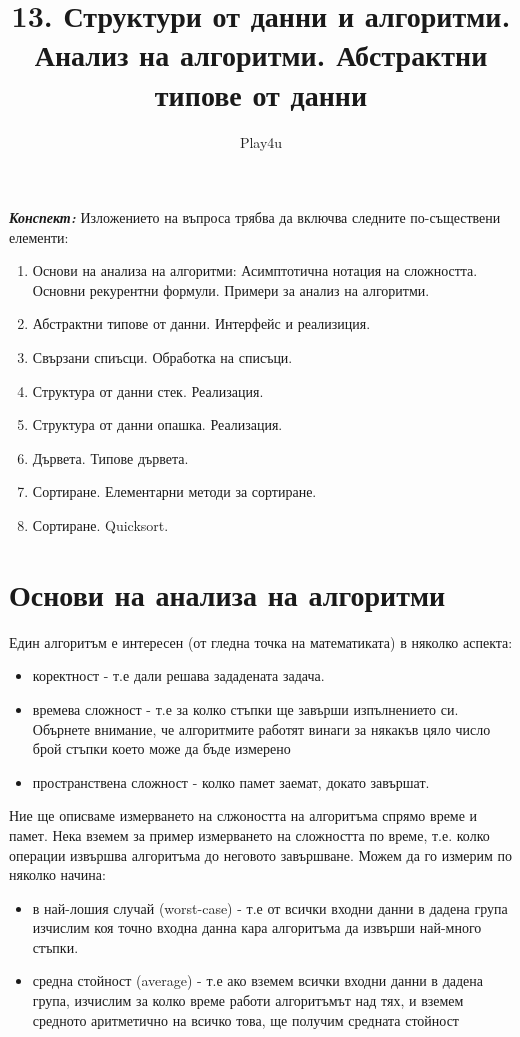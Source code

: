 \documentclass[11pt]{article} %
\title{13. Структури от данни и алгоритми. Анализ на алгоритми. Абстрактни типове от данни}
\author{Play4u}
\newcommand{\italicBold}[1]{\textbf{\emph{#1}}}
\newcommand{\enumNum}{\renewcommand{\theenumi}{\arabic{enumi}}}
\begin{document}
\maketitle

\italicBold{Конспект: } Изложението на въпроса трябва да включва следните по-съществени елементи:

\enumNum
\begin{enumerate}[noitemsep]
	\item Основи на анализа на алгоритми: Асимптотична нотация на сложността. Основни рекурентни формули. Примери за анализ на алгоритми.
	\item Абстрактни типове от данни. Интерфейс и реализиция.
	\item Свързани спиъсци. Обработка на списъци.
	\item Структура от данни стек. Реализация.
	\item Структура от данни опашка. Реализация.
	\item Дървета. Типове дървета.
	\item Сортиране. Елементарни методи за сортиране.
	\item Сортиране. Quicksort.\\\par
\end{enumerate}

\section{Основи на анализа на алгоритми}
Един алгоритъм е интересен (от гледна точка на математиката) в няколко аспекта:

\begin{itemize}[noitemsep]
	\item коректност - т.е дали решава зададената задача.
	\item времева сложност - т.е за колко стъпки ще завърши изпълнението си. Обърнете внимание, че алгоритмите работят винаги за някакъв цяло число брой стъпки което може да бъде измерено
	\item пространствена сложност - колко памет заемат, докато завършат.
\end{itemize}

Ние ще описваме измерването на слжоността на алгоритъма спрямо време и памет. Нека вземем за пример измерването на сложността по време, т.е. колко операции извършва алгоритъма до неговото завършване. Можем да го измерим по няколко начина:
\begin{itemize}[noitemsep]
	\item в най-лошия случай (worst-case) - т.е от всички входни данни в дадена група изчислим коя точно входна данна кара алгоритъма да извърши най-много стъпки.
	\item средна стойност (average) - т.е ако вземем всички входни данни в дадена група, изчислим за колко време работи алгоритъмът над тях, и вземем средното аритметично на всичко това, ще получим средната стойност

\end{itemize} 
\end{document}
